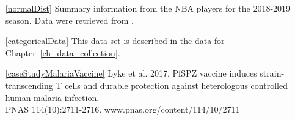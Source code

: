 \begin{itemize}
\item[\ref{normalDist}]
    Summary information from the NBA players for the
    2018-2019 season.
    Data were retrieved from
   .



\item[\ref{categoricalData}]
    This data set is described in
    the data for Chapter~\ref{ch_data_collection}.

\item[\ref{caseStudyMalariaVaccine}]
    Lyke et al. 2017.
    PfSPZ vaccine induces strain-transcending T cells
    and durable protection against heterologous controlled
    human malaria infection. \\
    PNAS 114(10):2711-2716.
        {www.pnas.org/content/114/10/2711}
\end{itemize}





